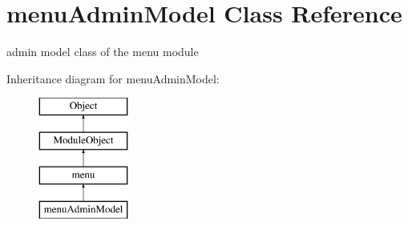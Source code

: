 \hypertarget{classmenuAdminModel}{}\section{menu\+Admin\+Model Class Reference}
\label{classmenuAdminModel}


admin model class of the menu module  


Inheritance diagram for menu\+Admin\+Model\+:\begin{figure}[H]
\begin{center}
\leavevmode
\includegraphics[height=4.000000cm]{classmenuAdminModel}
\end{center}
\end{figure}

